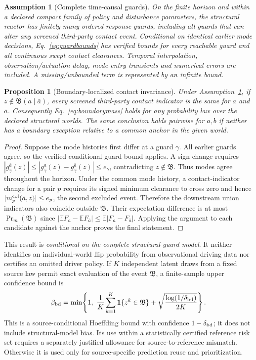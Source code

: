 \documentclass[10pt]{article}
\newcommand{\ind}{\mathbf{1}}
\newtheorem{proposition}{Proposition}\newtheorem{assumption}{Assumption}\newtheorem{remark}{Remark}
\begin{document}
\label{app:hybridlemma}
\begin{assumption}[Complete time-causal guards]\label{ass:hybrid}
On the finite horizon and within a declared compact family of policy and disturbance parameters, the structural reactor has finitely many ordered response guards, including all guards that can alter any screened third-party contact event. Conditional on identical earlier mode decisions, Eq.~\eqref{eq:guardbounds} has verified bounds for every reachable guard and all continuous swept contact clearances. Temporal interpolation, observation/actuation delay, mode-entry transients and numerical errors are included. A missing/unbounded term is represented by an infinite bound.
\end{assumption}
\begin{proposition}[Boundary-localized contact invariance]\label{prop:hybridboundary}
Under Assumption~\ref{ass:hybrid}, if $z\notin\mathfrak B(a\mid\bar a)$, every screened third-party contact indicator is the same for $a$ and $\bar a$. Consequently Eq.~\eqref{eq:boundarymass} holds for any probability law over the declared structural worlds. The same conclusion holds pairwise for $a,b$ if neither has a boundary exception relative to a common anchor in the given world.
\end{proposition}
\begin{proof}
Suppose the mode histories first differ at a guard $\gamma$. All earlier guards agree, so the verified conditional guard bound applies. A sign change requires $|g_\gamma^{\bar a}(z)|\le|g_\gamma^{a}(z)-g_\gamma^{\bar a}(z)|\le e_\gamma$, contradicting $z\notin\mathfrak B$. Thus modes agree throughout the horizon. Under the common mode history, a contact-indicator change for a pair $p$ requires its signed minimum clearance to cross zero and hence $|m_p^{\rm col}(\bar a,z)|\le e_p$, the second excluded event. Therefore the downstream union indicators also coincide outside $\mathfrak B$. Their expectation difference is at most $\Pr_m(\mathfrak B)$ since $|\mathbb E F_a-\mathbb E F_{\bar a}|\le\mathbb E|F_a-F_{\bar a}|$. Applying the argument to each candidate against the anchor proves the final statement.
\end{proof}
This result is \emph{conditional on the complete structural guard model}. It neither identifies an individual-world flip probability from observational driving data nor certifies an omitted driver policy. If $K$ independent latent draws from a fixed source law permit exact evaluation of the event $\mathfrak B$, a finite-sample upper confidence bound is
\begin{equation}
 \beta_{\rm bd}=\min\!\left\{1,\ \frac1K\sum_{k=1}^K\ind\{z^k\in\mathfrak B\}
 +\sqrt{\frac{\log(1/\delta_{\rm bd})}{2K}}\right\}.
 \label{eq:bdmassestimate}
\end{equation}
This is a source-conditional Hoeffding bound with confidence $1-\delta_{\rm bd}$; it does not include structural-model bias. Its use within a statistically certified reference risk set requires a separately justified allowance for source-to-reference mismatch. Otherwise it is used only for source-specific prediction reuse and prioritization.
\end{document}
